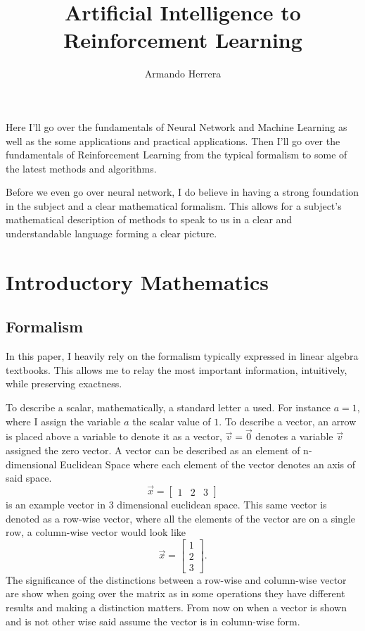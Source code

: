\documentclass{article}
\title{Artificial Intelligence to Reinforcement Learning}
\author{Armando Herrera}
\begin{document}
\maketitle

Here I'll go over the fundamentals of Neural Network and Machine Learning as well as the some applications and practical applications. Then I'll go over the fundamentals of Reinforcement Learning from the typical formalism to some of the latest methods and algorithms.

Before we even go over neural network, I do believe in having a strong foundation in the subject and a clear mathematical formalism. This allows for a subject's mathematical description of methods to speak to us in a clear and understandable language forming a clear picture.

\section{Introductory Mathematics}

\subsection{Formalism}

In this paper, I heavily rely on the formalism typically expressed in linear algebra textbooks. This allows me to relay the most important information, intuitively, while preserving exactness.

To describe a scalar, mathematically, a standard letter a used. For instance $a=1$, where I assign the variable $a$ the scalar value of $1$. To describe a vector, an arrow is placed above a variable to denote it as a vector, $\vec{v}=\vec{0}$ denotes a variable $\vec{v}$ assigned the zero vector. A vector can be described as an element of n-dimensional Euclidean Space where each element of the vector denotes an axis of said space. $$\vec{x}=\begin{bmatrix}1 & 2 & 3\end{bmatrix}$$ is an example vector in 3 dimensional euclidean space. This same vector is denoted as a row-wise vector, where all the elements of the vector are on a single row, a column-wise vector would look like $$\vec{x}=\begin{bmatrix}1 \\ 2 \\ 3\end{bmatrix}.$$ The significance of the distinctions between a row-wise and column-wise vector are show when going over the matrix as in some operations they have different results and making a distinction matters. From now on when a vector is shown and is not other wise said assume the vector is in column-wise form. 
\end{document}
